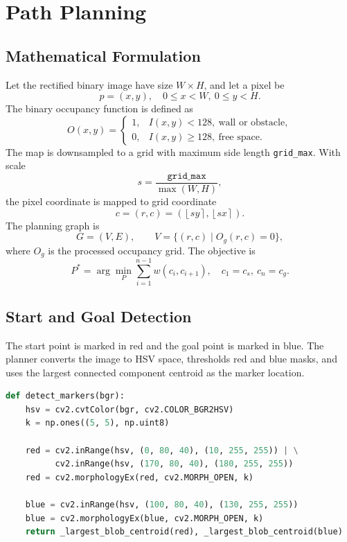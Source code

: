 \documentclass[a4paper,12pt]{article}
\begin{document}
\section{Path Planning}

\subsection{Mathematical Formulation}

Let the rectified binary image have size $W \times H$, and let a pixel be
\[
  p=(x,y), \quad 0 \le x < W,\ 0 \le y < H .
\]
The binary occupancy function is defined as
\[
  O(x,y)=
  \begin{cases}
    1, & I(x,y)<128,\ \text{wall or obstacle},\\
    0, & I(x,y)\ge 128,\ \text{free space}.
  \end{cases}
\]
The map is downsampled to a grid with maximum side length \texttt{grid\_max}. With scale
\[
  s=\frac{\texttt{grid\_max}}{\max(W,H)},
\]
the pixel coordinate is mapped to grid coordinate
\[
  c=(r,c)=\left(\left\lfloor sy \right\rceil,\left\lfloor sx \right\rceil\right).
\]
The planning graph is
\[
  G=(V,E), \qquad V=\{(r,c)\mid O_g(r,c)=0\},
\]
where $O_g$ is the processed occupancy grid. The objective is
\[
  P^*=\arg\min_P \sum_{i=1}^{n-1} w(c_i,c_{i+1}),
  \quad c_1=c_s,\ c_n=c_g .
\]

\subsection{Start and Goal Detection}

The start point is marked in red and the goal point is marked in blue. The planner converts the image to HSV space, thresholds red and blue masks, and uses the largest connected component centroid as the marker location.

\begin{lstlisting}[language=Python, caption={Red/blue marker detection}]
def detect_markers(bgr):
    hsv = cv2.cvtColor(bgr, cv2.COLOR_BGR2HSV)
    k = np.ones((5, 5), np.uint8)

    red = cv2.inRange(hsv, (0, 80, 40), (10, 255, 255)) | \
          cv2.inRange(hsv, (170, 80, 40), (180, 255, 255))
    red = cv2.morphologyEx(red, cv2.MORPH_OPEN, k)

    blue = cv2.inRange(hsv, (100, 80, 40), (130, 255, 255))
    blue = cv2.morphologyEx(blue, cv2.MORPH_OPEN, k)
    return _largest_blob_centroid(red), _largest_blob_centroid(blue)
\end{lstlisting}
\end{document}

